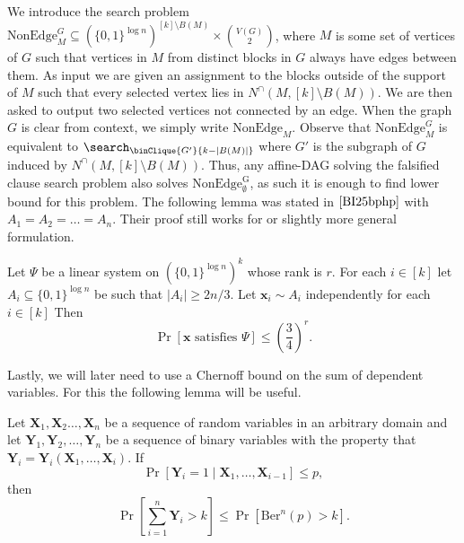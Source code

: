 We introduce the search problem $\mathrm{NonEdge}^G_M \subseteq (\{0,1\}^{\log n})^{[k]\setminus B(M)}\times \binom{V(G)}{2}$, where $M$ is some set of vertices of $G$ such that vertices in $M$ from distinct blocks in $G$ always have edges between them. As input we are given an assignment to the blocks outside of the support of $M$ such that every selected vertex lies in $N^\cap(M,[k]\setminus B(M))$. We are then asked to output two selected vertices not connected by an edge. When the graph $G$ is clear from context, we simply write $\mathrm{NonEdge}_M$. Observe that $\mathrm{NonEdge}_M^G$ is equivalent to $\search_{\binClique{G'}{k - |B(M)|}}$ where $G'$ is the subgraph of $G$ induced by $N^\cap(M,[k]\setminus B(M))$.  
Thus, any affine-DAG solving the falsified clause search problem also solves $\mathrm{NonEdge^G_\emptyset}$, as such it is enough to find lower bound for this problem. 
The following lemma was stated in $\cite{BI25bphp}$ with $A_1=A_2=\dots=A_n$. Their proof still works for or slightly more general formulation. 


\begin{lemma}
    \label{lemma:rank-probability-relation}
    Let $\Psi$ be a linear system on $(\{0,1\}^{\log n})^k$ whose rank is $r$. For each $i \in [k]$ let $A_i \subseteq \{0,1\}^{\log n}$ be such that $|A_i|\geq 2n/3$. Let $\bm x_i \sim A_i$ independently for each $i \in [k]$ Then \begin{equation*}
        \Pr[\bm x\textrm{ satisfies }\Psi] \leq \left(\frac{3}{4}\right)^r.
    \end{equation*} 
\end{lemma}

Lastly, we will later need to use a Chernoff bound on the sum of dependent variables.  For this the following lemma will be useful.

\begin{lemma}[{\cite[Lemma 17.3]{MU17}}]
\label{lemma:conditional-chernoff}
Let $\bm X_1,\bm X_2\dots,\bm X_n$ be a sequence of random variables in an arbitrary domain and let $\bm Y_1,\bm Y_2,\dots,\bm Y_n$ be a sequence of binary variables with the property that $\bm Y_i = \bm Y_i(\bm X_1,\dots,\bm X_i)$. If
\begin{equation*}
    \Pr[\bm Y_i =1\mid \bm X_1,\dots, \bm X_{i-1}] \leq p,
\end{equation*}
then 
\begin{equation*}
    \Pr\left[\sum_{i=1}^n \bm Y_i>k\right]\leq \Pr \left[\mathrm{Ber}^n(p)>k\right].
\end{equation*}
\end{lemma}

